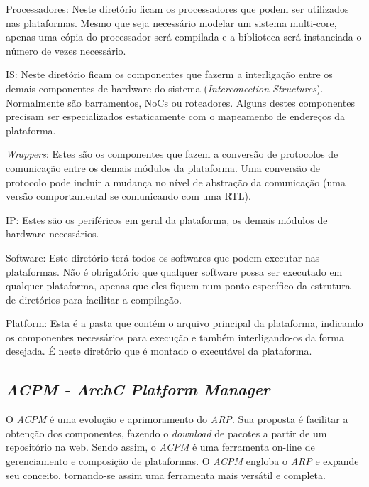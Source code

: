 \documentclass[10pt,a4paper]{article}
\begin{document}
\begin{description}
\item{Processadores:} Neste diretório ficam os processadores que podem
  ser utilizados nas plataformas. Mesmo que seja necessário modelar um
  sistema multi-core, apenas uma cópia do processador será compilada e
  a biblioteca será instanciada o número de vezes necessário.

\item{IS:} Neste diretório ficam os componentes que fazerm a
  interligação entre os demais componentes de hardware do sistema
  (\textit{Interconection Structures}). Normalmente são barramentos,
  NoCs ou roteadores. Alguns destes componentes precisam ser
  especializados estaticamente com o mapeamento de endereços da
  plataforma.

\item{\textit{Wrappers}:} Estes são os componentes que fazem a
  conversão de protocolos de comunicação entre os demais módulos da
  plataforma. Uma conversão de protocolo pode incluir a mudança no
  nível de abstração da comunicação (uma versão comportamental se
  comunicando com uma RTL).

\item{IP:} Estes são os periféricos em geral da
  plataforma, os demais módulos de hardware necessários.

\item{Software:} Este diretório terá todos os softwares que podem
  executar nas plataformas. Não é obrigatório que qualquer software
  possa ser executado em qualquer plataforma, apenas que eles fiquem
  num ponto específico da estrutura de diretórios para facilitar a
  compilação.

\item{Platform:} Esta é a pasta que contém o arquivo principal da
  plataforma, indicando os componentes necessários para execução e
  também interligando-os da forma desejada. É neste diretório que é
  montado o executável da plataforma.

\end{description}

\subsection{\textit{ACPM - ArchC Platform Manager}}

O \textit{ACPM} é uma evolução e aprimoramento do \textit{ARP}. Sua
proposta é facilitar a obtenção dos componentes, fazendo o
\textit{download} de pacotes a partir de um repositório na web. Sendo
assim, o \textit{ACPM} é uma ferramenta on-line de gerenciamento e
composição de plataformas. O \textit{ACPM} engloba o \textit{ARP} e
expande seu conceito, tornando-se assim uma ferramenta mais versátil e
completa.
\end{document}
